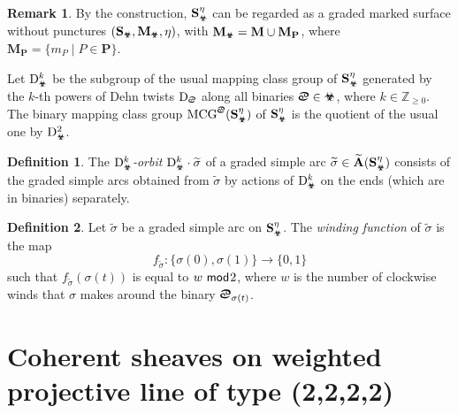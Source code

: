 \documentclass[11pt,a4paper,reqno]{amsart}%
\theoremstyle{plain}
\theoremstyle{definition}
\newtheorem{definition}[definition]{Definition}
\newtheorem{remark}[remark]{Remark}
\numberwithin{equation}{section}
\numberwithin{equation}{section}
\def\ZZ{\mathbb{Z}}
\renewcommand{\mod}{\mathsf{mod}\hspace{.01in}}
\def\surf{\mathbf{S}} %
\def\grad{\eta}
\def\gmsx{\gms\x}         %
\def\x{_\vot}
\newcommand{\MCG}{\operatorname{MCG}}
\def\Dfang{\mathrm{D}^2_\vot}
\newcommand{\gms}{\surf^\grad}
\def\surf{\mathbf{S}}                       %
\def\M{\mathbf{M}}
\def\A{\mathbf{A}}
\def\wA{\widetilde{\A}}
\renewcommand\P{\mathbf{P}} %
\def\vot{\text{\Biohazard}}
\def\sx{\text{\Cancer}}
\begin{document}
 
\begin{remark}
By the construction, $\gmsx$ can be regarded as a graded marked surface without punctures $(\surf\x,\M\x,\grad)$, with $\M\x=\M\cup\M_\P$, where $\M_\P=\{m_P\mid P\in\P \}$. 
\end{remark}

Let $\mathrm{D}_{\vot}^{k}$ be the subgroup of the  usual mapping class group  of $\gmsx$  generated by the  $k$-th powers of Dehn twists $\mathrm{D}_{\sx}$ along all binaries $\sx\in\vot$, where $k\in\ZZ_{\geq0}$.   The binary mapping class group $\MCG^\sx(\gmsx)$ of  $\gmsx$ is
the quotient of the usual one by  $\mathrm{D}_{\vot}^{2}$.
\begin{definition}\label{defn:orbit}  
    The \emph{$\mathrm{D}_{\vot}^{k}$-orbit} $\mathrm{D}_{\vot}^{k}\cdot\widetilde{\sigma}$ of a graded simple arc $\widetilde{\sigma}\in\wA (\gmsx)$ consists of the graded simple arcs   obtained from $\widetilde{\sigma}$ by actions of  $\mathrm{D}_{\vot}^{k}$ on the ends (which are in binaries) separately.
\end{definition} 
\begin{definition}\label{wfunction}
Let $\widetilde{\sigma}$ be a
  graded simple arc   on $\gmsx$. The \emph {winding function} of  $\widetilde{\sigma}$   is the map
\[
f_{\widetilde{\sigma}} \colon \{\sigma(0), \sigma(1)\} \to \{0,1\}
\]  such that $f_{\widetilde{\sigma}}(\sigma(t))$ is equal to $w\ \mod 2$, where $w$ is the  number of clockwise winds that  $ {\sigma}$ makes around the binary $\sx_{\sigma(t)}$.
\end{definition}


 
\section{Coherent sheaves on weighted projective line of type (2,2,2,2)}\label{sec:3}
\end{document}
